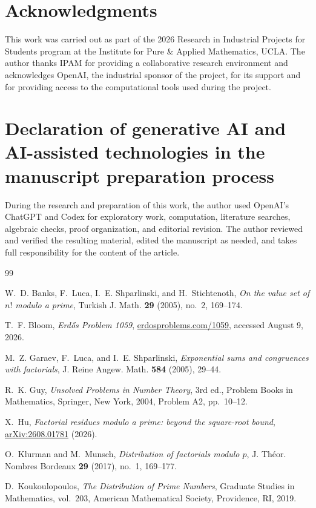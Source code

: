 \documentclass[11pt]{amsart}
\theoremstyle{definition}
\theoremstyle{remark}
\begin{document}
\section*{Acknowledgments}

This work was carried out as part of the 2026 Research in Industrial Projects
for Students program at the Institute for Pure \& Applied Mathematics,
UCLA.  The author thanks IPAM for providing a collaborative research
environment and acknowledges OpenAI, the industrial sponsor of the project,
for its support and for providing access to the computational tools used
during the project.

\section*{Declaration of generative AI and AI-assisted technologies in the
manuscript preparation process}

During the research and preparation of this work, the author used OpenAI's
ChatGPT and Codex for exploratory work, computation, literature searches,
algebraic checks, proof organization, and editorial revision.  The author
reviewed and verified the resulting material, edited the manuscript as
needed, and takes full responsibility for the content of the article.
\begin{thebibliography}{99}

W.~D. Banks, F.~Luca, I.~E. Shparlinski, and H.~Stichtenoth,
\emph{On the value set of $n!$ modulo a prime},
Turkish J. Math. \textbf{29} (2005), no.~2, 169--174.

T.~F. Bloom,
\emph{Erd\H{o}s Problem 1059},
\href{https://www.erdosproblems.com/1059}
{erdosproblems.com/1059}, accessed August 9, 2026.

M.~Z. Garaev, F.~Luca, and I.~E. Shparlinski,
\emph{Exponential sums and congruences with factorials},
J. Reine Angew. Math. \textbf{584} (2005), 29--44.

R.~K. Guy,
\emph{Unsolved Problems in Number Theory},
3rd ed., Problem Books in Mathematics, Springer, New York, 2004,
Problem A2, pp.~10--12.

X.~Hu,
\emph{Factorial residues modulo a prime: beyond the square-root bound},
\href{https://arxiv.org/abs/2608.01781}{arXiv:2608.01781} (2026).

O.~Klurman and M.~Munsch,
\emph{Distribution of factorials modulo $p$},
J. Th\'eor. Nombres Bordeaux \textbf{29} (2017), no.~1, 169--177.

D.~Koukoulopoulos,
\emph{The Distribution of Prime Numbers},
Graduate Studies in Mathematics, vol.~203,
American Mathematical Society, Providence, RI, 2019.

\end{thebibliography}
\end{document}
